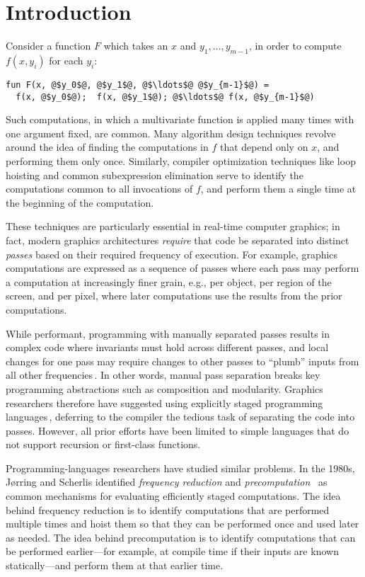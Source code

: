 \section{Introduction}

Consider a function $F$ which takes an $x$ and $y_1,\dots,y_{m-1}$, in order to
compute $f(x,y_i)$ for each $y_i$:
\begin{lstlisting}
fun F(x, @$y_0$@, @$y_1$@, @$\ldots$@ @$y_{m-1}$@) = 
  f(x, @$y_0$@);  f(x, @$y_1$@); @$\ldots$@ f(x, @$y_{m-1}$@)
\end{lstlisting}
%
Such computations, in which a multivariate function is applied many times with
one argument fixed, are common. Many algorithm design techniques revolve around
the idea of finding the computations in $f$ that depend only on $x$, and
performing them only once. Similarly, compiler optimization techniques like loop
hoisting and common subexpression elimination serve to identify the computations
common to all invocations of $f$, and perform them a single time at the
beginning of the computation.

These techniques are particularly essential in real-time computer graphics; in
fact, modern graphics architectures \emph{require} that code be separated into
distinct {\em passes} based on their required frequency of execution. For
example, graphics computations are expressed as a sequence of passes where each
pass may perform a computation at increasingly finer grain, e.g., per object,
per region of the screen, and per pixel, where later computations use the
results from the prior computations.

While performant, programming with manually separated passes results
in complex code where invariants must hold across different passes,
and local changes for one pass may require changes to other passes to
``plumb'' inputs from all other frequencies\,\cite{Foley:2011}.
%
In other words, manual pass separation breaks key programming
abstractions such as composition and modularity.
%
Graphics researchers therefore have suggested using explicitly staged
programming languages\,\cite{Proudfoot:2001,Foley:2011,He:2014},
deferring to the compiler the tedious task of separating the code into
passes. However, all prior efforts have been limited to simple
languages that do not support recursion or first-class functions.

Programming-languages researchers have studied similar problems. In
the 1980s, J{\o}rring and Scherlis identified {\em frequency
reduction} and {\em precomputation}~\cite{JS86-staging} as common
mechanisms for evaluating efficiently staged computations.  The idea
behind frequency reduction is to identify computations that are
performed multiple times and hoist them so that they can be performed
once and used later as needed.  The idea behind precomputation is to
identify computations that can be performed earlier---for example, at
compile time if their inputs are known statically---and perform them
at that earlier time.

